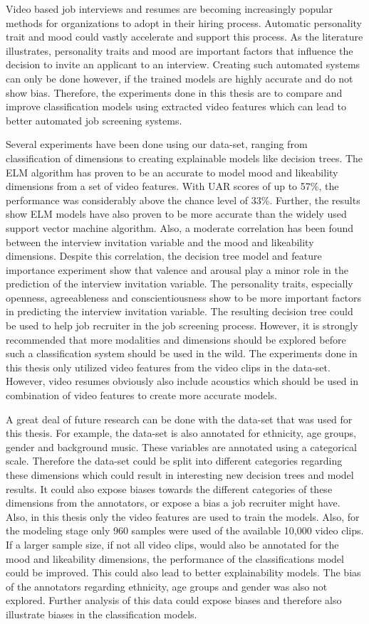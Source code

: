 Video based job interviews and resumes are becoming increasingly popular methods for organizations to adopt in their hiring process. Automatic personality trait and mood could vastly accelerate and support this process. As the literature illustrates, personality traits and mood are important factors that influence the decision to invite an applicant to an interview. Creating such automated systems can only be done however, if the trained models are highly accurate and do not show bias. Therefore, the experiments done in this thesis are to compare and improve classification models using extracted video features which can lead to better automated job screening systems.

Several experiments have been done using our data-set, ranging from classification of dimensions to creating explainable models like decision trees. The ELM algorithm has proven to be an accurate to model mood and likeability dimensions from a set of video features. With UAR scores of up to 57\%, the performance was considerably above the chance level of 33\%. Further, the results show ELM models have also proven to be more accurate than the widely used support vector machine algorithm. Also, a moderate correlation has been found between the interview invitation variable and the mood and likeability dimensions. Despite this correlation, the decision tree model and feature importance experiment show that valence and arousal play a minor role in the prediction of the interview invitation variable. The personality traits, especially openness, agreeableness and conscientiousness show to be more important factors in predicting the interview invitation variable. The resulting decision tree could be used to help job recruiter in the job screening process. However, it is strongly recommended that more modalities and dimensions should be explored before such a classification system should be used in the wild. The experiments done in this thesis only utilized video features from the video clips in the data-set. However, video resumes obviously also include acoustics which should be used in combination of video features to create more accurate models. 

A great deal of future research can be done with the data-set that was used for this thesis. For example, the data-set is also annotated for ethnicity, age groups, gender and background music. These variables are annotated using a categorical scale. Therefore the data-set could be split into different categories regarding these dimensions which could result in interesting new decision trees and model results. It could also expose biases towards the different categories of these dimensions from the annotators, or expose a bias a job recruiter might have. Also, in this thesis only the video features are used to train the models. Also, for the modeling stage only 960 samples were used of the available 10,000 video clips. If a larger sample size, if not all video clips, would also be annotated for the mood and likeability dimensions, the performance of the classifications model could be improved. This could also lead to better explainability models. The bias of the annotators regarding ethnicity, age groups and gender was also not explored. Further analysis of this data could expose biases and therefore also illustrate biases in the classification models. 